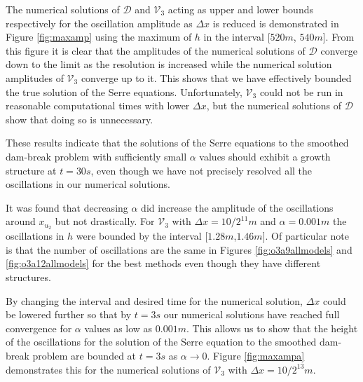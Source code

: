 \documentclass[times]{elsarticle}
\begin{document}
The numerical solutions of $\mathcal{D}$ and $\mathcal{V}_3$ acting as upper and lower bounds respectively for the oscillation amplitude as $\Delta x$ is reduced is demonstrated in Figure \ref{fig:maxamp} using the maximum of $h$ in the interval [$520m$, $540m$]. From this figure it is clear that the amplitudes of the numerical solutions of $\mathcal{D}$ converge down  to the limit as the resolution is increased while the numerical solution amplitudes of $\mathcal{V}_3$ converge up to it. This shows that we have effectively bounded the true solution of the Serre equations. Unfortunately, $\mathcal{V}_3$ could not be run in reasonable computational times with lower $\Delta x$, but the numerical solutions of $\mathcal{D}$ show that doing so is unnecessary.

These results indicate that the solutions of the Serre equations to the smoothed dam-break problem with sufficiently small $\alpha$ values should exhibit a growth structure at $t=30s$, even though we have not precisely resolved all the oscillations in our numerical solutions. 

It was found that decreasing $\alpha$ did increase the amplitude of the oscillations around $x_{u_2}$ but not drastically. For $\mathcal{V}_3$ with $\Delta x= 10/2^{11}m$ and $\alpha = 0.001m$ the oscillations in $h$ were bounded by the interval [$1.28m$,$1.46m$]. Of particular note is that the number of oscillations are the same in Figures \ref{fig:o3a9allmodels} and \ref{fig:o3a12allmodels} for the best methods even though they have different structures.

By changing the interval and desired time for the numerical solution, $\Delta x$ could be lowered further so that by $t=3s$ our numerical solutions have reached full convergence for $\alpha$ values as low as $0.001m$. This allows us to show that the height of the oscillations for the solution of the Serre equation to the smoothed dam-break problem are bounded at $t=3s$ as $\alpha \rightarrow 0$. Figure \ref{fig:maxampa} demonstrates this for the numerical solutions of $\mathcal{V}_3$ with $\Delta x = 10/2^{13}m$. 
\end{document}
